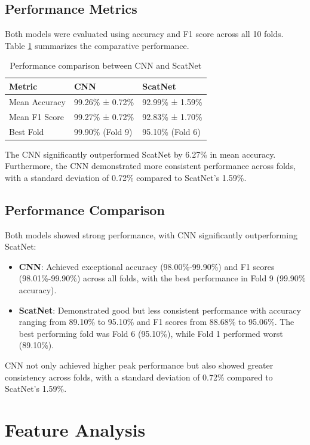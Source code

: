 \documentclass[10pt,twocolumn]{article}
\begin{document}
\subsection{Performance Metrics}
Both models were evaluated using accuracy and F1 score across all 10 folds. Table \ref{tab:performance} summarizes the comparative performance.

\begin{table}[h]
\centering
\caption{Performance comparison between CNN and ScatNet}
\label{tab:performance}
\begin{tabular}{lll}
\toprule
Metric & CNN & ScatNet \\
\midrule
Mean Accuracy & 99.26\% ± 0.72\% & 92.99\% ± 1.59\% \\
Mean F1 Score & 99.27\% ± 0.72\% & 92.83\% ± 1.70\% \\
Best Fold & 99.90\% (Fold 9) & 95.10\% (Fold 6) \\
\bottomrule
\end{tabular}
\end{table}

The CNN significantly outperformed ScatNet by 6.27\% in mean accuracy. Furthermore, the CNN demonstrated more consistent performance across folds, with a standard deviation of 0.72\% compared to ScatNet's 1.59\%.

\subsection{Performance Comparison}
Both models showed strong performance, with CNN significantly outperforming ScatNet:

\begin{itemize}
    \item \textbf{CNN}: Achieved exceptional accuracy (98.00\%-99.90\%) and F1 scores (98.01\%-99.90\%) across all folds, with the best performance in Fold 9 (99.90\% accuracy).
    
    \item \textbf{ScatNet}: Demonstrated good but less consistent performance with accuracy ranging from 89.10\% to 95.10\% and F1 scores from 88.68\% to 95.06\%. The best performing fold was Fold 6 (95.10\%), while Fold 1 performed worst (89.10\%).
\end{itemize}

CNN not only achieved higher peak performance but also showed greater consistency across folds, with a standard deviation of 0.72\% compared to ScatNet's 1.59\%.

\section{Feature Analysis}
\end{document}
